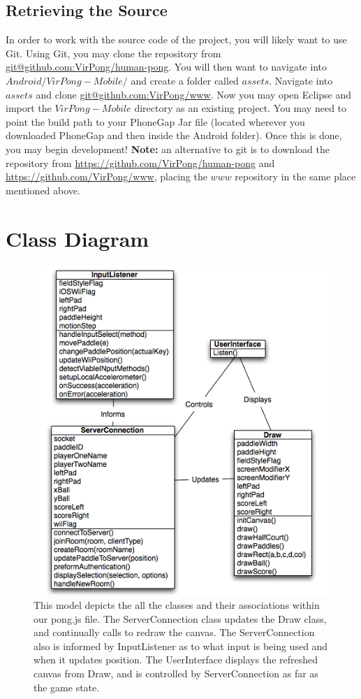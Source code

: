 \documentclass[12pt]{article}
\begin{document}
\subsection{Retrieving the Source}
In order to work with the source code of the project, you will likely want to use Git\cite{Github}.  Using Git, you may clone the repository from \url{git@github.com:VirPong/human-pong}.  You will then want to navigate into $Android/VirPong-Mobile/$ and create a folder called $assets$.  Navigate into $assets$ and clone \url{git@github.com:VirPong/www}.  Now you may open Eclipse and import the $VirPong-Mobile$ directory as an existing project.  You may need to point the build path to your PhoneGap Jar file (located wherever you downloaded PhoneGap and then inside the Android folder).  Once this is done, you may begin development!  \textbf{Note:} an alternative to git is to download the repository from \url{https://github.com/VirPong/human-pong} and \url{https://github.com/VirPong/www}, placing the $www$ repository in the same place mentioned above.

\section{Class Diagram}
\begin{figure}
\begin{center}
\includegraphics[scale=.5]{ClassDiagram.png}
\caption{\label{Class Diagram}This model depicts the all the classes and their associations within our pong.js file.  The ServerConnection class updates the Draw class, and continually calls to redraw the canvas.  The ServerConnection also is informed by InputListener as to what input is being used and when it updates position.  The UserInterface displays the refreshed canvas from Draw, and is controlled by ServerConnection as far as the game state.}
\end{center}
\end{figure}
\end{document}
